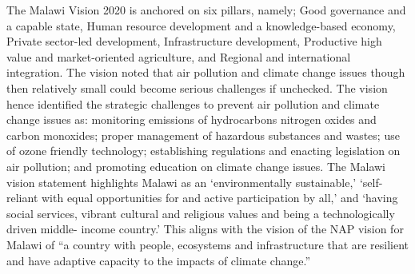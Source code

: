 \documentclass[
]{book}
\begin{document}
The Malawi Vision 2020 is anchored on six pillars, namely; Good governance and a capable state, Human resource development and a knowledge-based economy, Private
sector-led development, Infrastructure development, Productive high value and market-oriented agriculture, and Regional and international integration. The vision
noted that air pollution and climate change issues though then relatively small could become serious challenges if unchecked. The vision hence identified the
strategic challenges to prevent air pollution and climate change issues as: monitoring emissions of hydrocarbons nitrogen oxides and carbon monoxides; proper
management of hazardous substances and wastes; use of ozone friendly technology; establishing regulations and enacting legislation on air pollution; and
promoting education on climate change issues. The Malawi vision statement highlights Malawi as an `environmentally sustainable,' `self-reliant with equal
opportunities for and active participation by all,' and `having social services, vibrant cultural and religious values and being a technologically driven middle-
income country.' This aligns with the vision of the NAP vision for Malawi of ``a country with people, ecosystems and infrastructure that are resilient and have
adaptive capacity to the impacts of climate change.''
\end{document}
